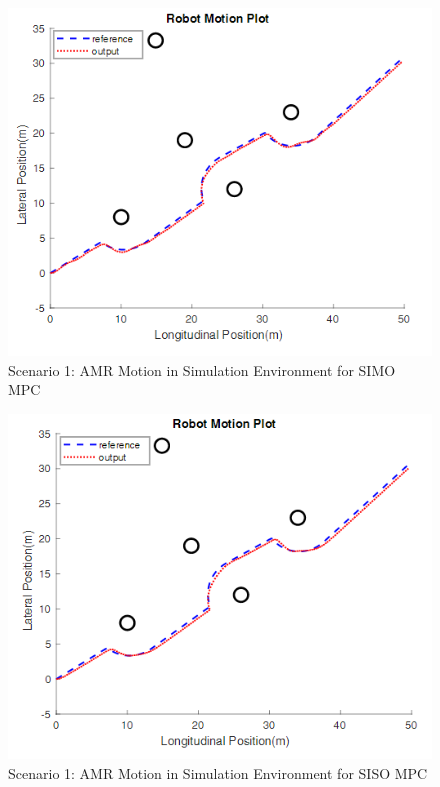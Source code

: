 \documentclass[a4paper, twocolumn]{article}
\begin{document}
\begin{figure}
    \centering
    \includegraphics[scale=0.40]{img/scenario_1/mpc2-robot_motion.png}
    \caption{Scenario 1: AMR Motion in Simulation Environment for SIMO MPC}
    \label{fig:scen_1_mpc2_rob_mot}
\end{figure}

\begin{figure}
    \centering
    \includegraphics[scale=0.40]{img/scenario_1/mpc1-robot_motion.png}
    \caption{Scenario 1: AMR Motion in Simulation Environment for SISO MPC}
    \label{fig:scen_1_mpc1_rob_mot}
\end{figure}
\end{document}
